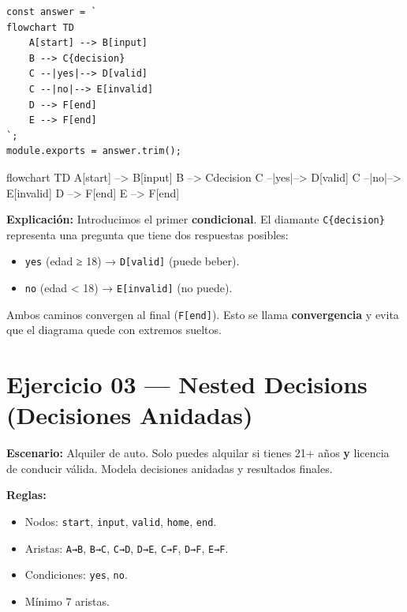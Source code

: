 \documentclass[10pt,a4paper]{article}
\newenvironment{mermaid}[1][]
  {%
   \begin{mdframed}[%
     linecolor=blue!50!black,
     backgroundcolor=blue!3,
     innertopmargin=6pt,
     innerbottommargin=6pt,
     leftmargin=0pt,
     rightmargin=0pt,
     skipabove=10pt,
     skipbelow=10pt,
     frametitle={Diagrama Mermaid},
     frametitlefont={\small\bfseries\color{blue!70!black}},
   ]%
   \small\ttfamily
  }
  {%
   \end{mdframed}%
  }
\begin{document}
\begin{lstlisting}[style=jsstyle]
const answer = `
flowchart TD
    A[start] --> B[input]
    B --> C{decision}
    C --|yes|--> D[valid]
    C --|no|--> E[invalid]
    D --> F[end]
    E --> F[end]
`;
module.exports = answer.trim();
\end{lstlisting}

\begin{mermaid}
flowchart TD
    A[start] --> B[input]
    B --> C{decision}
    C --|yes|--> D[valid]
    C --|no|--> E[invalid]
    D --> F[end]
    E --> F[end]
\end{mermaid}

\textbf{Explicación:}
Introducimos el primer \textbf{condicional}. El diamante \texttt{C\{decision\}}
representa una pregunta que tiene dos respuestas posibles:
\begin{itemize}
  \item \texttt{yes} (edad ≥ 18) → \texttt{D[valid]} (puede beber).
  \item \texttt{no}  (edad < 18) → \texttt{E[invalid]} (no puede).
\end{itemize}
Ambos caminos convergen al final (\texttt{F[end]}). Esto se llama
\textbf{convergencia} y evita que el diagrama quede con extremos
sueltos.

\newpage

\section{Ejercicio 03 — Nested Decisions (Decisiones Anidadas)}

\textbf{Escenario:} Alquiler de auto. Solo puedes alquilar si tienes
21+ años \textbf{y} licencia de conducir válida. Modela decisiones
anidadas y resultados finales.

\textbf{Reglas:}
\begin{itemize}
  \item Nodos: \texttt{start}, \texttt{input}, \texttt{valid},
        \texttt{home}, \texttt{end}.
  \item Aristas: \texttt{A→B}, \texttt{B→C}, \texttt{C→D},
        \texttt{D→E}, \texttt{C→F}, \texttt{D→F}, \texttt{E→F}.
  \item Condiciones: \texttt{yes}, \texttt{no}.
  \item Mínimo 7 aristas.
\end{itemize}
\end{document}
